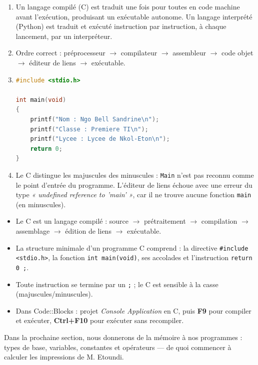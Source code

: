 \documentclass[11pt]{article}
\newcommand{\cle}[1]{{\popxbold\color{popdark}#1}}
\begin{document}
\begin{corrige}[Exercice]
\begin{enumerate}
\item Un langage compilé (C) est traduit une fois pour toutes en code machine avant l'exécution, produisant un exécutable autonome. Un langage interprété (Python) est traduit et exécuté instruction par instruction, à chaque lancement, par un interpréteur.
\item Ordre correct : préprocesseur $\rightarrow$ compilateur $\rightarrow$ assembleur $\rightarrow$ code objet $\rightarrow$ éditeur de liens $\rightarrow$ exécutable.
\item \begin{lstlisting}[language=C]
#include <stdio.h>

int main(void)
{
    printf("Nom : Ngo Bell Sandrine\n");
    printf("Classe : Premiere TI\n");
    printf("Lycee : Lycee de Nkol-Eton\n");
    return 0;
}
\end{lstlisting}
\item Le C distingue les majuscules des minuscules : \texttt{Main} n'est pas reconnu comme le point d'entrée du programme. L'éditeur de liens échoue avec une erreur du type \emph{« undefined reference to 'main' »}, car il ne trouve aucune fonction \texttt{main} (en minuscules).
\end{enumerate}
\end{corrige}

\begin{aretenir}
\begin{itemize}
\item Le C est un langage \cle{compilé} : source $\rightarrow$ prétraitement $\rightarrow$ compilation $\rightarrow$ assemblage $\rightarrow$ édition de liens $\rightarrow$ exécutable.
\item La structure minimale d'un programme C comprend : la directive \texttt{\#include <stdio.h>}, la fonction \texttt{int main(void)}, ses accolades et l'instruction \texttt{return 0 ;}.
\item Toute instruction se termine par un \texttt{;} ; le C est sensible à la casse (majuscules/minuscules).
\item Dans Code::Blocks : projet \emph{Console Application} en C, puis \textbf{F9} pour compiler et exécuter, \textbf{Ctrl+F10} pour exécuter sans recompiler.
\end{itemize}
Dans la prochaine section, nous donnerons de la mémoire à nos programmes : types de base, variables, constantes et opérateurs — de quoi commencer à calculer les impressions de M. Etoundi.
\end{aretenir}
\end{document}
